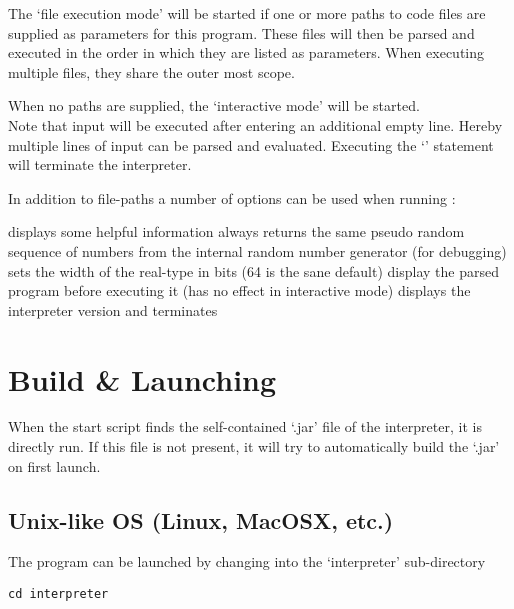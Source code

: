 The `file execution mode' will be started if one or more paths to code files are supplied as parameters for this program. These files will then be parsed and executed in the order in which they are listed as parameters. When executing multiple files, they share the outer most scope.

When no paths are supplied, the `interactive mode' will be started.\\
Note that input will be executed after entering an additional empty line. Hereby multiple lines of input can be parsed and evaluated. Executing the `' statement will terminate the interpreter.


In addition to file-paths a number of options can be used when running \setlX{}:

\begin{itemize}
	      {displays some helpful information}
	      {always returns the same pseudo random sequence of numbers from the internal random number generator (for debugging)}
           {sets the width of the real-type in bits (64 is the sane default)}
           {display the parsed program before executing it (has no effect in interactive mode)}
           {displays the interpreter version and terminates}
\end{itemize}

\section{Build \& Launching}

When the start script finds the self-contained `.jar' file of the interpreter, it is directly run. If this file is not present, it will try to automatically build the `.jar' on first launch.

\subsection{Unix-like OS (Linux, MacOSX, etc.)}

The \setlX{} program can be launched by changing into the `interpreter' sub-directory

\begin{lstlisting}
cd interpreter
\end{lstlisting}

